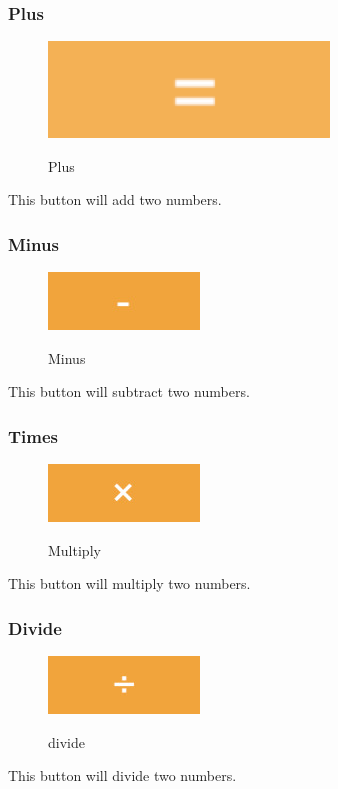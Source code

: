 \documentclass[11pt, a4paper]{article}
\begin{document}
    \subsubsection{Plus}
    \label{subsubsec:plus}
    \begin{figure}[h]
        \caption{Plus}
        \includegraphics[scale = 0.2]{plus}
        \centering
        \label{fig:plus}
    \end{figure}
    This button will add two numbers.

    \subsubsection{Minus}
    \label{subsubsec:minus}
    \begin{figure}[hbt!]
        \caption{Minus}
        \includegraphics[scale = 0.2]{minus}
        \centering
        \label{fig:minus}
    \end{figure}
    This button will subtract two numbers.

    \subsubsection{Times}
    \label{subsubsec:times}
    \begin{figure}[hbt!]
        \caption{Multiply}
        \includegraphics[scale = 0.2]{multiply}
        \centering
        \label{fig:mul}
    \end{figure}
    This button will multiply two numbers.

    \subsubsection{Divide}
    \label{subsubsec:division}
    \begin{figure}[hbt!]
        \caption{divide}
        \includegraphics[scale = 0.2]{divide}
        \centering
        \label{fig:div}
    \end{figure}
    This button will divide two numbers.
\end{document}
